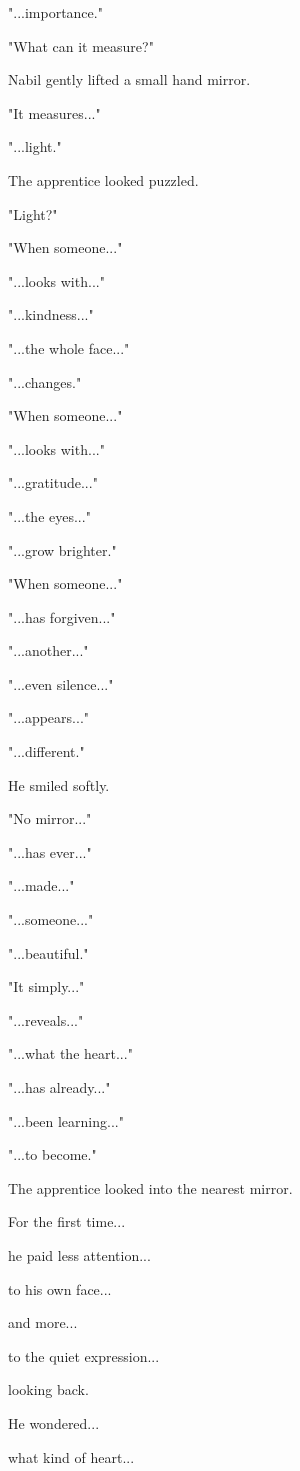 \documentclass[12pt,openany]{book}
\begin{document}
"...importance."

"What can it measure?"

Nabil gently lifted a small hand mirror.

"It measures..."

"...light."

The apprentice looked puzzled.

"Light?"

"When someone..."

"...looks with..."

"...kindness..."

"...the whole face..."

"...changes."

"When someone..."

"...looks with..."

"...gratitude..."

"...the eyes..."

"...grow brighter."

"When someone..."

"...has forgiven..."

"...another..."

"...even silence..."

"...appears..."

"...different."

He smiled softly.

"No mirror..."

"...has ever..."

"...made..."

"...someone..."

"...beautiful."

"It simply..."

"...reveals..."

"...what the heart..."

"...has already..."

"...been learning..."

"...to become."

The apprentice looked into the nearest mirror.

For the first time...

he paid less attention...

to his own face...

and more...

to the quiet expression...

looking back.

He wondered...

what kind of heart...
\end{document}
